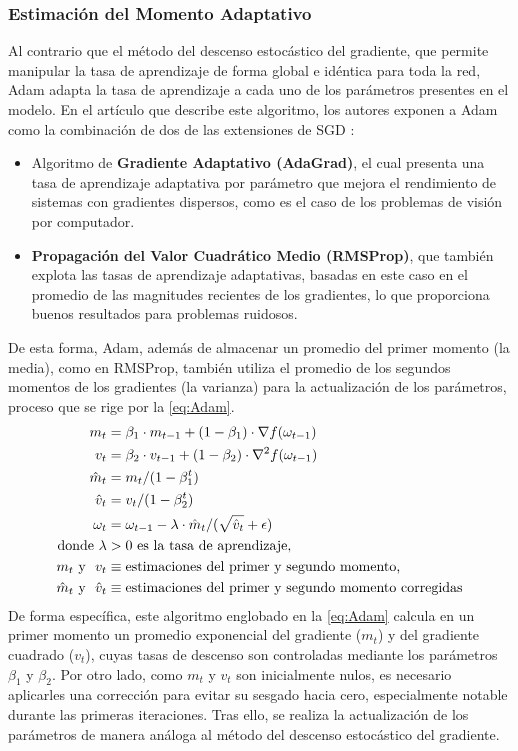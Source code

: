 \subsubsection{Estimación del Momento Adaptativo}

Al contrario que el método del descenso estocástico del gradiente, que permite manipular la tasa de aprendizaje de forma global e idéntica para toda la red, Adam adapta la tasa de aprendizaje a cada uno de los parámetros presentes en el modelo. En el artículo que describe este algoritmo, los autores exponen a Adam como la combinación de dos de las extensiones de SGD \cite{Adam}:
\begin{itemize}
  \item Algoritmo de \textbf{Gradiente Adaptativo (AdaGrad)}, el cual presenta una tasa de aprendizaje adaptativa por parámetro que mejora el rendimiento de sistemas con gradientes dispersos, como es el caso de los problemas de visión por computador. 
  \item \textbf{Propagación del Valor Cuadrático Medio (RMSProp)}, que también explota las tasas de aprendizaje adaptativas, basadas en este caso en el promedio de las magnitudes recientes de los gradientes, lo que proporciona buenos resultados para problemas ruidosos. 
\end{itemize}

De esta forma, Adam, además de almacenar un promedio del primer momento (la media), como en RMSProp, también utiliza el promedio de los segundos momentos de los gradientes (la varianza) para la actualización de los parámetros, proceso que se rige por la \autoref{eq:Adam}.
\begin{align}
    m_t &= \beta_1 \cdot m_{t-1} + (1 - \beta_1) \cdot \nabla f(\omega_{t-1}) \label{eq:AdamBeta1}\\
    v_t &= \beta_2 \cdot v_{t-1} + (1 - \beta_2) \cdot \nabla^2 f(\omega_{t-1}) \label{eq:AdamBeta2}\\
    \hat{m}_t &= m_t / (1 - \beta_1^t) \\
    \hat{v}_t &= v_t / (1 - \beta_2^t) \\
    \omega_t &= \omega_{t-1} - \lambda \cdot \hat{m}_t / (\sqrt{\hat{v}_t} + \epsilon) \label{eq:Adam} \\
    \text{donde}~
    \lambda &> 0 \text{\space es la tasa de aprendizaje,} \notag \\
    m_t \text{\space y \space} v_t &\equiv \text{estimaciones del primer y segundo momento,} \notag \\
    \hat{m}_t \text{\space y \space} \hat{v}_t &\equiv \text{estimaciones del primer y segundo momento corregidas} \notag
\end{align}
De forma específica, este algoritmo englobado en la \autoref{eq:Adam} calcula en un primer momento un promedio exponencial del gradiente ($m_t$) y del gradiente cuadrado ($v_t$), cuyas tasas de descenso son controladas mediante los parámetros $\beta_1$ y $\beta_2$. Por otro lado, como $m_t$ y $v_t$ son inicialmente nulos, es necesario aplicarles una corrección para evitar su sesgado hacia cero, especialmente notable durante las primeras iteraciones. Tras ello, se realiza la actualización de los parámetros de manera análoga al método del descenso estocástico del gradiente.


